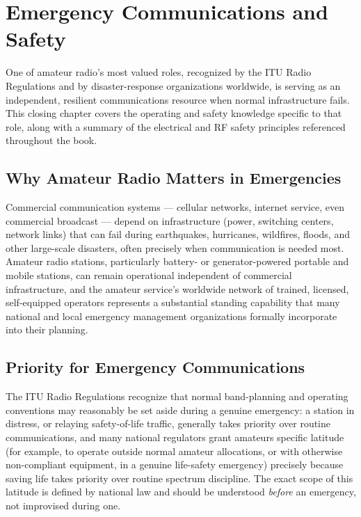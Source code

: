 \chapter{Emergency Communications and Safety}
\label{ch:emergency-comms}

One of amateur radio's most valued roles, recognized by the ITU
Radio Regulations and by disaster-response organizations worldwide, is
serving as an independent, resilient communications resource when
normal infrastructure fails. This closing chapter covers the operating
and safety knowledge specific to that role, along with a summary of the
electrical and RF safety principles referenced throughout the book.

\section{Why Amateur Radio Matters in Emergencies}

Commercial communication systems --- cellular networks, internet
service, even commercial broadcast --- depend on infrastructure (power,
switching centers, network links) that can fail during earthquakes,
hurricanes, wildfires, floods, and other large-scale disasters, often
precisely when communication is needed most. Amateur radio stations,
particularly battery- or generator-powered portable and mobile
stations, can remain operational independent of commercial
infrastructure, and the amateur service's worldwide network of trained,
licensed, self-equipped operators represents a substantial standing
capability that many national and local emergency management
organizations formally incorporate into their planning.

\section{Priority for Emergency Communications}

\begin{keyidea}
The ITU Radio Regulations recognize that normal band-planning and
operating conventions may reasonably be set aside during a genuine
emergency: a station in distress, or relaying safety-of-life traffic,
generally takes priority over routine communications, and many national
regulators grant amateurs specific latitude (for example, to operate
outside normal amateur allocations, or with otherwise non-compliant
equipment, in a genuine life-safety emergency) precisely because saving
life takes priority over routine spectrum discipline. The exact scope
of this latitude is defined by national law and should be understood
\emph{before} an emergency, not improvised during one.
\end{keyidea}

